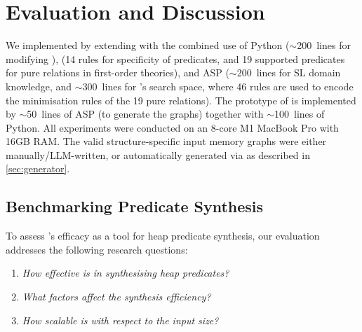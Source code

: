 
\vspace{-5pt}

\section{Evaluation and Discussion}
\label{sec:evaluation}


We implemented \tool by extending \popper with the combined use of
Python ($\sim$200~lines for modifying \popper), \prolog (14 rules for
specificity of predicates, and 19 supported predicates for pure
relations in first-order theories), and ASP ($\sim$200~lines for SL domain knowledge, and $\sim$300~lines for \tool's search space, where 46 rules are used to encode the minimisation rules of the 19 pure relations).
 The prototype of \ggen is implemented by $\sim$50~lines of ASP (to generate the graphs) together with $\sim$100~lines of Python. 
All experiments were conducted on
an 8-core M1 MacBook Pro with 16GB RAM. The valid structure-specific
input memory graphs were either manually/LLM-written, or automatically
generated via \ggen as described in \autoref{sec:generator}.





\subsection{Benchmarking Predicate Synthesis}
\label{sec:done}

To assess \tool's efficacy as a tool for heap predicate synthesis, our
evaluation addresses the following research questions:
%
\begin{enumerate}[label=\textbf{RQ 1.\arabic*},topsep=2pt,leftmargin=40pt]
\item\label{rq11} \emph{How effective is \tool in synthesising heap predicates?}
\item\label{rq12} \emph{What factors affect the synthesis efficiency?}
\item\label{rq13} \emph{How scalable is \tool with respect to the input size?}
\end{enumerate}




